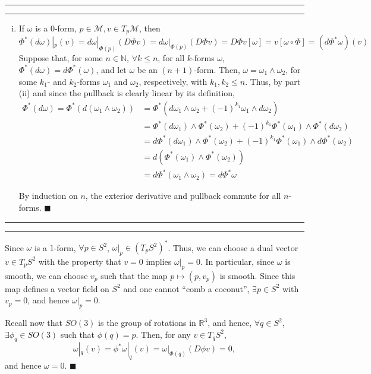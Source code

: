 \documentclass[11pt]{article}
\newcounter{questionCounter}
\newcounter{partCounter}[questionCounter]
\newenvironment{question}[2][\arabic{questionCounter}]{%
    \setcounter{partCounter}{0}%
    \vspace{.25in} \hrule \vspace{0.5em}%
        \noindent{\bf #2}%
    \vspace{0.8em} \hrule \vspace{.10in}%
    \addtocounter{questionCounter}{1}%
}{}
\renewcommand{\qed}{\quad \ensuremath{\blacksquare}}    %
\newcommand{\N}{\mathbb{N}}             %
\newcommand{\R}{\mathbb{R}}             %
\newcommand{\M}{\mathcal{M}}            %
\begin{document}
\begin{question}{Problem 4}
\begin{enumerate}[(i)]
\newpage
\item If $\omega$ is a $0$-form, $p \in \M, v \in T_p\M$, then
\[\Phi^*(d\omega)|_p(v)
    = d\omega|_{\Phi(p)}(D\Phi v)
    = d\omega|_{\Phi(p)}(D\Phi v)
    = D\Phi v [\omega]
    = v [\omega \circ \Phi]
    = (d\Phi^*\omega) (v)
\]
Suppose that, for some $n \in \N$, $\forall k \leq n$, for all $k$-forms
$\omega$, $\Phi^*(d\omega) = d\Phi^*(\omega)$, and let $\omega$ be an
$(n + 1)$-form. Then, $\omega = \omega_1 \wedge \omega_2$, for some $k_1$- and
$k_2$-forms $\omega_1$ and $\omega_2$, respectively, with $k_1,k_2 \leq n$.
Thus, by part (ii) and since the pullback is clearly linear by its definition,
\begin{align*}
\Phi^*(d\omega)
   = \Phi^*(d(\omega_1 \wedge \omega_2))
 & = \Phi^*(d\omega_1 \wedge \omega_2 + (-1)^{k_1}\omega_1 \wedge d\omega_2)\\
 & = \Phi^*(d\omega_1) \wedge \Phi^*(\omega_2)
        + (-1)^{k_1}\Phi^*(\omega_1) \wedge \Phi^*(d\omega_2) \\
 & = d\Phi^*(d\omega_1) \wedge \Phi^*(\omega_2)
        + (-1)^{k_1}\Phi^*(\omega_1) \wedge d\Phi^*(\omega_2) \\
 & = d\left(\Phi^*(\omega_1) \wedge \Phi^*(\omega_2)\right) \\
 & = d\Phi^*(\omega_1 \wedge \omega_2)
   = d\Phi^*\omega
\end{align*}

By induction on $n$, the exterior derivative and pullback commute for all
$n$-forms. \qed
\end{enumerate}
\end{question}

\begin{question}{Problem 5}
Since $\omega$ is a $1$-form, $\forall p \in S^2$, $\omega|_p \in (T_pS^2)^*$.
Thus, we can choose a dual vector $v \in T_pS^2$ with the property that $v = 0$
implies $\omega|_p = 0$. In particular, since $\omega$ is smooth, we can choose
$v_p$ such that the map $p \mapsto (p,v_p)$ is smooth. Since this map defines a
vector field on $S^2$ and one cannot ``comb a coconut'', $\exists p \in S^2$
with $v_p = 0$, and hence $\omega|_p = 0$.

Recall now that $SO(3)$ is the group of rotations in $\R^3$, and hence,
$\forall q \in S^2$, $\exists \phi_q \in SO(3)$ such that $\phi(q) = p$. Then,
for any $v \in T_qS^2$,
\[\omega|_q(v) = \phi^*\omega|_q(v) = \omega|_{\Phi(q)}(D\phi v) = 0,\]
and hence $\omega = 0$. \qed
\end{question}
\end{document}
